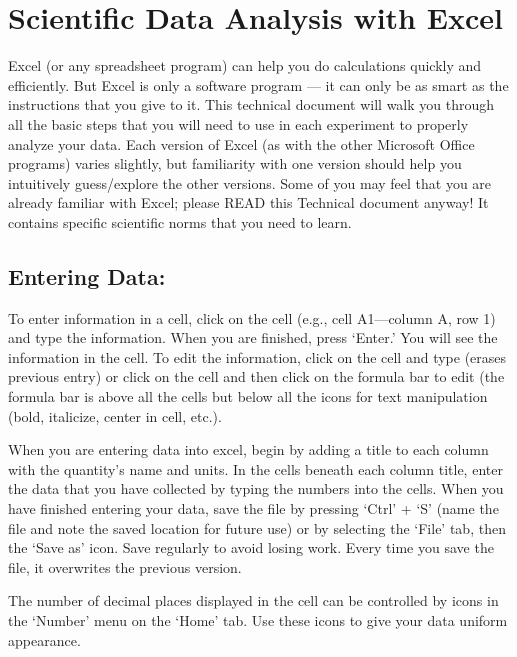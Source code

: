 \chapter{Scientific Data Analysis with Excel}
\thispagestyle{fancy}
%
Excel (or any spreadsheet program) can help you do calculations quickly and efficiently. 
But Excel is only a software program — it can only be as smart as the instructions that you give to it.
This technical document will walk you through all the basic steps that you will need to use in each experiment to properly analyze your data.
Each version of Excel (as with the other Microsoft Office programs) varies slightly, but familiarity with one version should help you intuitively guess/explore the other versions. 
Some of you may feel that you are already familiar with Excel; please READ this Technical document anyway! 
It contains specific scientific norms that you need to learn.

\section*{Entering Data:}
To enter information in a cell, click on the cell (e.g., cell A1—column A, row 1) and type the information. 
When you are finished, press `Enter.' 
You will see the information in the cell. 
To edit the information, click on the cell and type (erases previous entry) or click on the cell and then click on the formula bar to edit (the formula bar is above all the cells but below all the icons for text manipulation (bold, italicize, center in cell, etc.).
\par 
When you are entering data into excel, begin by adding a title to each column with the quantity's name and units.
In the cells beneath each column title, enter the data that you have collected by typing the numbers into the cells.
When you have finished entering your data, save the file by pressing `Ctrl' + `S' (name the file and note the saved location for future use) or by selecting the `File' tab, then the `Save as' icon. 
Save regularly to avoid losing work.
Every time you save the file, it overwrites the previous version.
\par 
The number of decimal places displayed in the cell can be controlled by icons in the `Number' menu on the `Home' tab.
Use these icons to give your data uniform appearance.

